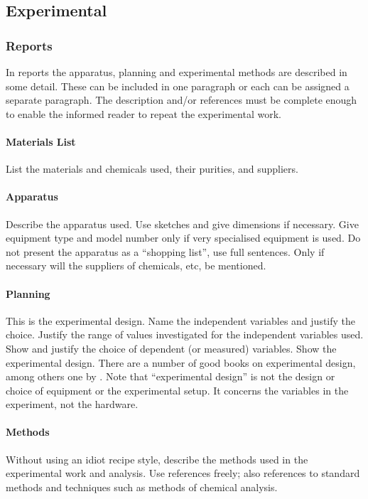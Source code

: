 \documentclass[a5paper, 10pt]{article}
\begin{document}
\subsection{Experimental}
\label{sec:experimental}
\subsubsection{Reports}

In reports the apparatus, planning and experimental methods are
described in some detail.  These can be included in one paragraph or
each can be assigned a separate paragraph.  The description and/or
references must be complete enough to enable the informed reader to
repeat the experimental work.

\paragraph{Materials List}
List the materials and chemicals used, their purities, and suppliers.

\paragraph{Apparatus} 
Describe the apparatus used.  Use sketches and give dimensions if
necessary.  Give equipment type and model number only if very specialised
equipment is used.  Do not present the apparatus as a ``shopping
list'', use full sentences. Only if necessary will the suppliers of chemicals, etc, be mentioned.

\paragraph{Planning}
This is the experimental design.
Name the independent variables and justify the choice.  Justify the
range of values investigated for the independent variables used.  Show
and justify the choice of dependent (or measured) variables.  Show the
experimental design.  There are a number of good books on experimental
design, among others one by \citet{hicks}.  Note that
``experimental design'' is not the design or choice of equipment or
the experimental setup.  It concerns the variables in the experiment,
not the hardware.

\paragraph{Methods}
Without using an idiot recipe style, describe the methods used in the
experimental work and analysis.  Use references freely; also
references to standard methods and techniques such as methods of
chemical analysis.
\end{document}
